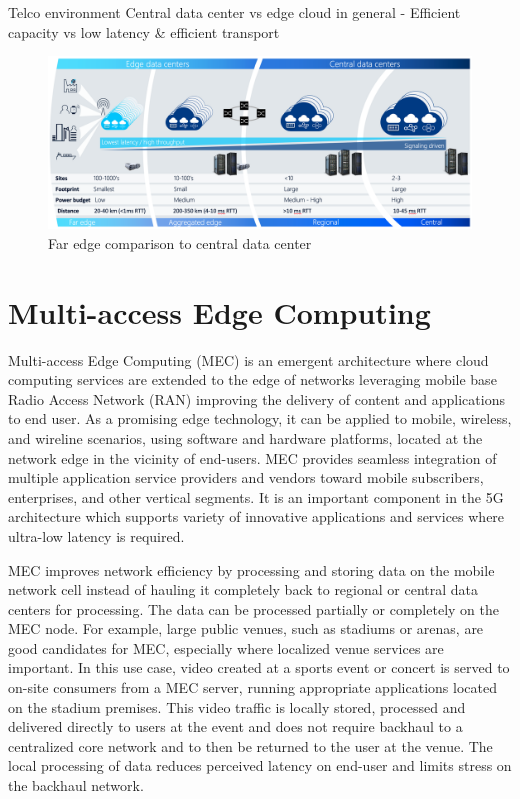 Telco environment
Central data center vs edge cloud in general
    - Efficient capacity vs low latency \& efficient transport


\begin{figure}[ht]
  \begin{center}
    \includegraphics[width=13.5cm]{images/AirFrame.png}
    \caption{Far edge comparison to central data center \cite{AirFrameOpenEdgeServer}}
    \label{fig:AirFrame}
  \end{center}
\end{figure}

\section{Multi-access Edge Computing}

Multi-access Edge Computing (MEC) is an emergent architecture where  cloud computing services are extended to the edge of networks leveraging mobile base Radio Access Network (RAN) improving the delivery of content and applications to end user. As a promising edge technology, it can be applied to mobile, wireless, and wireline scenarios, using software and hardware platforms, located at the network edge in the vicinity of end-users. MEC provides seamless integration of multiple application service providers and vendors toward mobile subscribers, enterprises, and other vertical segments. It is an important component in the 5G architecture which supports variety of innovative applications and services where ultra-low latency is required. \cite{Abbas2018}

MEC improves network efficiency by processing and storing data on the mobile network cell instead of hauling it completely back to regional or central data centers for processing. The data can be processed partially or completely on the MEC node. For example, large public venues, such as stadiums or arenas, are good candidates for MEC, especially where localized venue services are important. In this use case, video created at a sports event or concert is served to on-site consumers from a MEC server, running appropriate applications located on the stadium premises. This video traffic is locally stored, processed and delivered directly to users at the event and does not require backhaul to a centralized core network and to then be returned to the user at the venue. The local processing of data reduces perceived latency on end-user and limits stress on the backhaul network. \cite{Brown2016}

